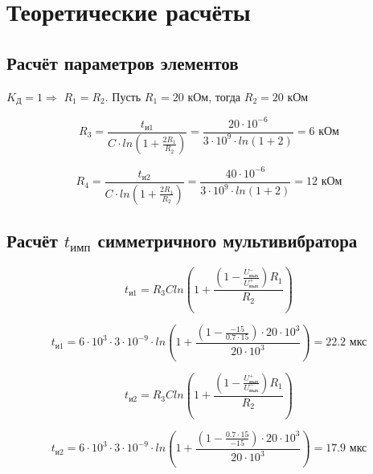 \section{Теоретические расчёты}

\subsection{Расчёт параметров элементов}

$K_\text{Д} = 1 \Rightarrow$ $R_1 = R_2$. Пусть $R_1 = 20$ кОм, тогда $R_2 = 20$ кОм

\begin{displaymath}
	R_3 = \frac{t_{\text{и1}}}{C \cdot ln(1 + \frac{2R_1}{R_2})} = \frac{20 \cdot 10^{-6}}{3 \cdot 10^9 \cdot ln(1 + 2)} = 6 \text{ кОм}
\end{displaymath}

\begin{displaymath}
	R_4 = \frac{t_{\text{и2}}}{C \cdot ln(1 + \frac{2R_1}{R_2})} = \frac{40 \cdot 10^{-6}}{3 \cdot 10^9 \cdot ln(1 + 2)} = 12 \text{ кОм}
\end{displaymath} 

\subsection{Расчёт $t_\text{имп}$ симметричного мультивибратора}

\begin{equation}
	\label{eq:4:1}
	t_{\text{и1}} = R_3 C ln\left(1 + \frac{\left(1 - \frac{U_\text{вых}^{-}}{U_\text{вых}^{+}}\right) R_1}{R_2}\right) 
\end{equation}

\begin{displaymath}
	t_{\text{и1}} = 6 \cdot 10^3 \cdot 3 \cdot 10^{-9} \cdot ln\left(1 + \frac{\left(1 - \frac{-15}{0.7 \cdot 15}\right)\cdot 20 \cdot 10^3}{20 \cdot 10^3}\right) = 22.2 \text{ мкс}
\end{displaymath}

\begin{equation}
	\label{eq:4:2}
	t_{\text{и2}} = R_3 C ln\left(1 + \frac{\left(1 - \frac{U_\text{вых}^{+}}{U_\text{вых}^{-}}\right) R_1}{R_2}\right) 
\end{equation}

\begin{displaymath}
	t_{\text{и2}} = 6 \cdot 10^3 \cdot 3 \cdot 10^{-9} \cdot ln\left(1 + \frac{\left(1 - \frac{0.7 \cdot 15}{-15}\right)\cdot 20 \cdot 10^3}{20 \cdot 10^3}\right) = 17.9 \text{ мкс}
\end{displaymath}

